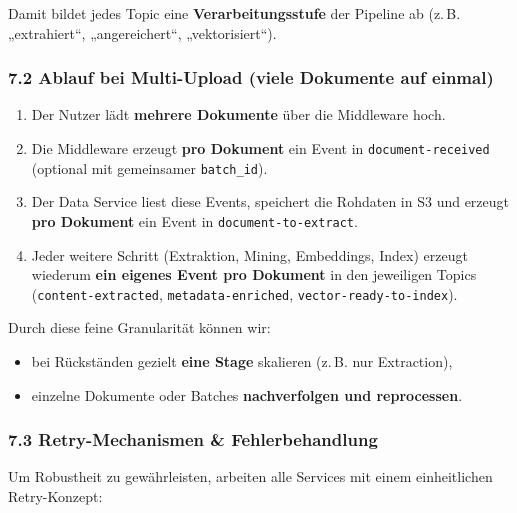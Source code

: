 Damit bildet jedes Topic eine \textbf{Verarbeitungsstufe} der Pipeline
ab (z.\,B. „extrahiert``, „angereichert``, „vektorisiert``).

\subsubsection{7.2 Ablauf bei Multi-Upload (viele Dokumente auf
einmal)}\label{ablauf-bei-multi-upload-viele-dokumente-auf-einmal}

\begin{enumerate}
\def\labelenumi{\arabic{enumi}.}
\tightlist
\item
  Der Nutzer lädt \textbf{mehrere Dokumente} über die Middleware hoch.\\
\item
  Die Middleware erzeugt \textbf{pro Dokument} ein Event in
  \texttt{document-received} (optional mit gemeinsamer
  \texttt{batch\_id}).\\
\item
  Der Data Service liest diese Events, speichert die Rohdaten in S3 und
  erzeugt \textbf{pro Dokument} ein Event in
  \texttt{document-to-extract}.\\
\item
  Jeder weitere Schritt (Extraktion, Mining, Embeddings, Index) erzeugt
  wiederum \textbf{ein eigenes Event pro Dokument} in den jeweiligen
  Topics (\texttt{content-extracted}, \texttt{metadata-enriched},
  \texttt{vector-ready-to-index}).
\end{enumerate}

Durch diese feine Granularität können wir:

\begin{itemize}
\tightlist
\item
  bei Rückständen gezielt \textbf{eine Stage} skalieren (z.\,B. nur
  Extraction),
\item
  einzelne Dokumente oder Batches \textbf{nachverfolgen und
  reprocessen}.
\end{itemize}

\subsubsection{7.3 Retry-Mechanismen \&
Fehlerbehandlung}\label{retry-mechanismen-fehlerbehandlung}

Um Robustheit zu gewährleisten, arbeiten alle Services mit einem
einheitlichen Retry-Konzept:

